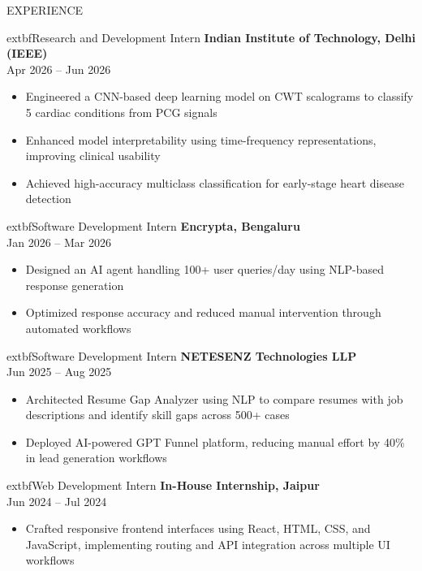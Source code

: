 \documentclass{resume}
\begin{document}
\begin{rSection}{EXPERIENCE}

	extbf{Research and Development Intern} \hfill \textbf{Indian Institute of Technology, Delhi (IEEE)} \\
Apr 2026 -- Jun 2026
\begin{itemize}
    \item Engineered a CNN-based deep learning model on CWT scalograms to classify 5 cardiac conditions from PCG signals
    \item Enhanced model interpretability using time-frequency representations, improving clinical usability
    \item Achieved high-accuracy multiclass classification for early-stage heart disease detection
\end{itemize}

	extbf{Software Development Intern} \hfill \textbf{Encrypta, Bengaluru} \\
Jan 2026 -- Mar 2026
\begin{itemize}
    \item Designed an AI agent handling 100+ user queries/day using NLP-based response generation
    \item Optimized response accuracy and reduced manual intervention through automated workflows
\end{itemize}

	extbf{Software Development Intern} \hfill \textbf{NETESENZ Technologies LLP} \\
Jun 2025 -- Aug 2025
\begin{itemize}
    \item Architected Resume Gap Analyzer using NLP to compare resumes with job descriptions and identify skill gaps across 500+ cases
    \item Deployed AI-powered GPT Funnel platform, reducing manual effort by 40\% in lead generation workflows
\end{itemize}

	extbf{Web Development Intern} \hfill \textbf{In-House Internship, Jaipur} \\
Jun 2024 -- Jul 2024
\begin{itemize}
    \item Crafted responsive frontend interfaces using React, HTML, CSS, and JavaScript, implementing routing and API integration across multiple UI workflows
\end{itemize}

\end{rSection}
\end{document}
